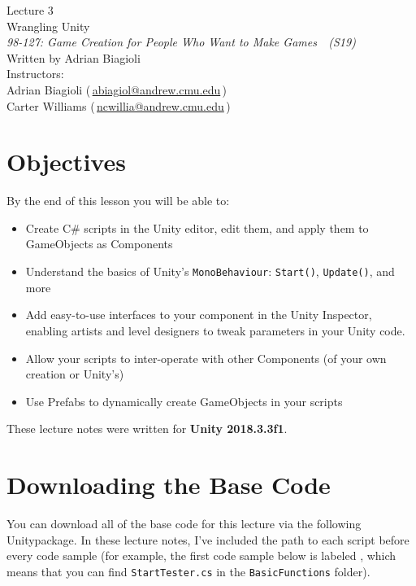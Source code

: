 \documentclass[11pt]{article}
\makeatletter
\newcommand{\lecturenum}{3}
\newcommand{\lecturename}{Wrangling Unity}
\newcommand{\authorname}{Adrian Biagioli}
\newcommand{\coursenum}{98-127}
\newcommand{\coursename}{Game Creation for People Who Want to Make Games}
\newcommand{\coursesem}{S19}
\newcommand{\instructors}{Adrian Biagioli (\,\href{mailto:abiagiol@andrew.cmu.edu}{abiagiol@andrew.cmu.edu}\,) \\ Carter Williams (\,\href{mailto:ncwillia@andrew.cmu.edu}{ncwillia@andrew.cmu.edu}\,)}
\makeatother
\begin{document}
\thispagestyle{plain}
{
    \vspace{1.5em}
    \begin{center}
    {
        \huge
        Lecture \lecturenum \\
        \vspace{0.5em}
        \lecturename
        \vspace{0.4em}
    } \\
    {
        \it
        \coursenum: \coursename\ \ (\coursesem)
    } \\
    \vspace{1.0em}
    Written by \authorname \\
    \vspace{0.7em}
    Instructors:\\ \instructors
    \end{center}
}

\section{Objectives}

By the end of this lesson you will be able to:
\begin{itemize}
    \item Create C\# scripts in the Unity editor, edit them, and apply them to GameObjects as Components
    \item Understand the basics of Unity's \lstinline|MonoBehaviour|: \lstinline|Start()|, \lstinline|Update()|, and more
    \item Add easy-to-use interfaces to your component in the Unity Inspector, enabling artists and level designers to
          tweak parameters in your Unity code.
    \item Allow your scripts to inter-operate with other Components (of your own creation or Unity's)
    \item Use Prefabs to dynamically create GameObjects in your scripts
\end{itemize}

\noindent These lecture notes were written for {\bf Unity 2018.3.3f1}.

\section{Downloading the Base Code}

You can download all of the base code for this lecture via the following Unitypackage.  In these lecture notes, I've
included the path to each script before every code sample (for example, the first code sample below is labeled
, which means that you can find \lstinline|StartTester.cs| in the
\lstinline|BasicFunctions| folder).
\end{document}
